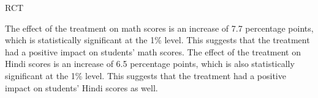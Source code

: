 \begin{homeworkProblem}{RCT}
\begin{solution}
\begin{enumerate}
\begin{enumerate}
                    \begin{table}[!htbp] \centering \color{blue}
                    \end{table} 

                    The effect of the treatment on math scores is an increase 
                    of 7.7 percentage points, which is statistically 
                    significant at the 1\% level. This suggests that the 
                    treatment had a positive impact on students' math scores.
                    The effect of the treatment on Hindi scores is an increase
                    of 6.5 percentage points, which is also statistically
                    significant at the 1\% level. This suggests that the
                    treatment had a positive impact on students' Hindi scores
                    as well.


\end{enumerate}
\end{enumerate}
\end{solution}
\end{homeworkProblem}
